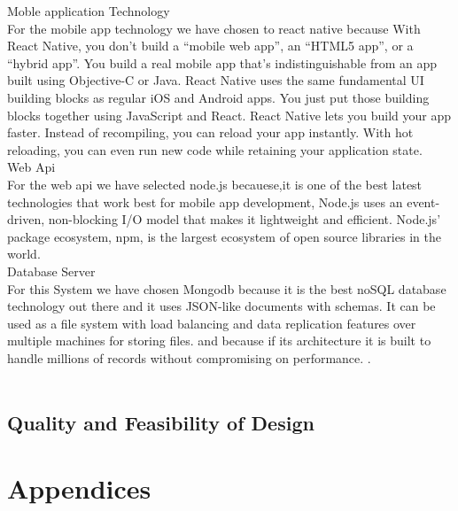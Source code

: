 \documentclass{article}
\begin{document}
							{Moble application Technology\\
For the mobile app technology we have chosen to react native because 
With React Native, you don't build a “mobile web app”, an “HTML5 app”, or a “hybrid app”.
 You build a real mobile app that's indistinguishable from an app built using Objective-C or Java.
 React Native uses the same fundamental UI building blocks as regular iOS and Android apps.
 You just put those building blocks together using JavaScript and React.
React Native lets you build your app faster. Instead of recompiling, you can reload your app instantly. With hot reloading,
 you can even run new code while retaining your application state.\\

Web Api\\
For the web api we have selected node.js becauese,it is one of the best latest technologies that work best for mobile app development, Node.js uses an event-driven,
 non-blocking I/O model that makes it lightweight and efficient. Node.js' package ecosystem,
 npm, is the largest ecosystem of open source libraries in the world.\\
 
Database Server\\
For this System we have chosen Mongodb because it is the best noSQL database technology out there and it uses JSON-like documents with schemas.
It can be used as a file system with load balancing and data replication features over multiple machines for storing files.
and because if its architecture it is built to handle millions of records without compromising on performance.
.\\\\}
			
			
			\subsection{Quality and Feasibility of Design}\label{subsec:quality}

	 \cleardoublepage
	 \section{Appendices}\label{sec:appendices}
 		
	
\end{document}
